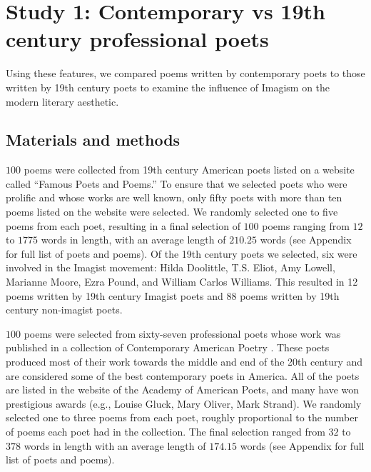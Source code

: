 \documentclass{book}
\begin{document}

\section{Study 1: Contemporary vs 19th century professional poets}
Using these features, we compared poems written by contemporary poets to those written by 19th century poets to examine the influence of Imagism on the modern literary aesthetic.

\subsection{Materials and methods}

$100$ poems were collected from 19th century American poets listed on a website called ``Famous Poets and Poems.'' To ensure that we selected poets who were prolific and whose works are well known, only fifty poets with more than ten poems listed on the website were selected. We randomly selected one to five poems from each poet, resulting in a final selection of $100$ poems ranging from $12$ to $1775$ words in length, with an average length of $210.25$ words (see Appendix for full list of poets and poems). %
Of the 19th century poets we selected, six were involved in the Imagist movement: Hilda Doolittle, T.S. Eliot, Amy Lowell, Marianne Moore, Ezra Pound, and William Carlos Williams. This resulted in 12 poems written by 19th century Imagist poets and 88 poems written by 19th century non-imagist poets. 
 
$100$ poems were selected from sixty-seven professional poets whose work was published in a collection of Contemporary American Poetry \citep{ContempAmPoetry}. These poets produced most of their work towards the middle and end of the 20th century and are considered some of the best contemporary poets in America. All of the poets are listed in the website of the Academy of American Poets, and many have won prestigious awards (e.g., Louise Gluck, Mary Oliver, Mark Strand). We randomly selected one to three poems from each poet, roughly proportional to the number of poems each poet had in the collection. The final selection ranged from $32$ to $378$ words in length with an average length of $174.15$ words (see Appendix for full list of poets and poems).
\end{document}
